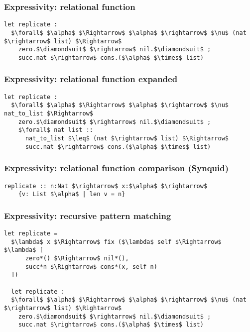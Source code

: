 \documentclass{beamer}
\begin{document}
\begin{frame}[fragile]
  \frametitle{Expressivity: relational function}

  \begin{lstlisting}[]
  let replicate : 
  $\forall$ $\alpha$ $\Rightarrow$ $\alpha$ $\rightarrow$ $\nu$ (nat $\rightarrow$ list) $\Rightarrow$ 
    zero.$\diamondsuit$ $\rightarrow$ nil.$\diamondsuit$ ; 
    succ.nat $\rightarrow$ cons.($\alpha$ $\times$ list)
  \end{lstlisting}


\end{frame}

\begin{frame}[fragile]

  \frametitle{Expressivity: relational function expanded}

  \begin{lstlisting}[]
  let replicate : 
  $\forall$ $\alpha$ $\Rightarrow$ $\alpha$ $\rightarrow$ $\nu$ nat_to_list $\Rightarrow$ 
    zero.$\diamondsuit$ $\rightarrow$ nil.$\diamondsuit$ ; 
    $\forall$ nat list :: 
      nat_to_list $\leq$ (nat $\rightarrow$ list) $\Rightarrow$ 
      succ.nat $\rightarrow$ cons.($\alpha$ $\times$ list)
  \end{lstlisting}

\end{frame}

\begin{frame}[fragile]

  \frametitle{Expressivity: relational function comparison (Synquid)}

  \begin{lstlisting}[keywords={termination, measure, data, where}]
  replicate :: n:Nat $\rightarrow$ x:$\alpha$ $\rightarrow$ 
    {v: List $\alpha$ | len v = n}

  \end{lstlisting}

  \hfill
\end{frame}

\begin{frame}[fragile]
  \frametitle{Expressivity: recursive pattern matching}
  \begin{lstlisting}[]
  let replicate = 
  $\lambda$ x $\Rightarrow$ fix ($\lambda$ self $\Rightarrow$ $\lambda$ [
      zero*() $\Rightarrow$ nil*(),
      succ*n $\Rightarrow$ cons*(x, self n)
  ])

  let replicate : 
  $\forall$ $\alpha$ $\Rightarrow$ $\alpha$ $\rightarrow$ $\nu$ (nat $\rightarrow$ list) $\Rightarrow$ 
    zero.$\diamondsuit$ $\rightarrow$ nil.$\diamondsuit$ ; 
    succ.nat $\rightarrow$ cons.($\alpha$ $\times$ list)
  \end{lstlisting}
\end{frame}
\end{document}
